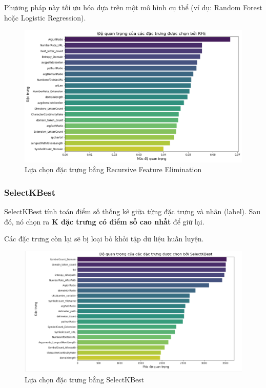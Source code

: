 \documentclass[13pt]{article}
\begin{document}
Phương pháp này tối ưu hóa dựa trên một mô hình cụ thể (ví dụ: Random Forest hoặc Logistic Regression).

    \begin{figure}[h!]
        \centering        \includegraphics[width=0.7\linewidth]{image/h21.png}
            \caption{Lựa chọn đặc trưng bằng Recursive Feature Elimination}
            \label{fig:label1}
    \end{figure}

\subsubsection{SelectKBest}
SelectKBest tính toán điểm số thống kê giữa từng đặc trưng và nhãn (label). Sau đó, nó chọn ra \textbf{K đặc trưng có điểm số cao nhất} để giữ lại.

Các đặc trưng còn lại sẽ bị loại bỏ khỏi tập dữ liệu huấn luyện.

    \begin{figure}[h!]
        \centering        \includegraphics[width=0.7\linewidth]{image/h22.png}
            \caption{Lựa chọn đặc trưng bằng SelectKBest}
            \label{fig:label1}
    \end{figure}
\end{document}
